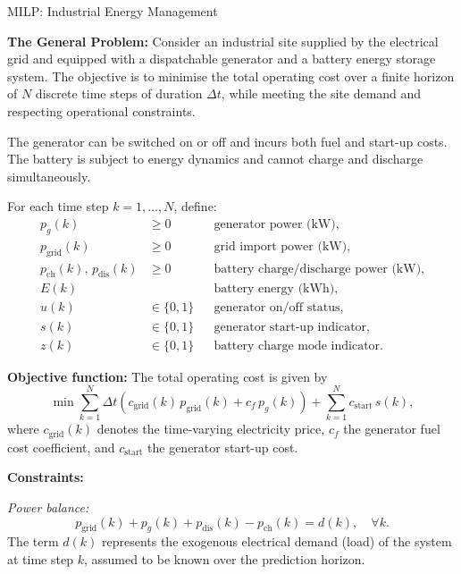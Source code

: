 \begin{examplebox}{MILP: Industrial Energy Management}
	
	\textbf{The General Problem:}
	Consider an industrial site supplied by the electrical grid and equipped with a dispatchable generator and a battery energy storage system. The objective is to minimise the total operating cost over a finite horizon of $N$ discrete time steps of duration $\Delta t$, while meeting the site demand and respecting operational constraints.
	
	The generator can be switched on or off and incurs both fuel and start-up costs. The battery is subject to energy dynamics and cannot charge and discharge simultaneously.
	
	\medskip
	
	For each time step $k=1,\dots,N$, define:
	\begin{align*}
		p_g(k) &\ge 0 && \text{generator power (kW)},\\
		p_{\mathrm{grid}}(k) &\ge 0 && \text{grid import power (kW)},\\
		p_{\mathrm{ch}}(k),\, p_{\mathrm{dis}}(k) &\ge 0 && \text{battery charge/discharge power (kW)},\\
		E(k) & && \text{battery energy (kWh)},\\
		u(k) &\in \{0,1\} && \text{generator on/off status},\\
		s(k) &\in \{0,1\} && \text{generator start-up indicator},\\
		z(k) &\in \{0,1\} && \text{battery charge mode indicator}.
	\end{align*}
	
	\medskip
	\textbf{Objective function:}
	The total operating cost is given by
	\begin{equation}
		\min \sum_{k=1}^{N} \Delta t 
		\left(
		c_{\mathrm{grid}}(k)\,p_{\mathrm{grid}}(k)
		+
		c_f\,p_g(k)
		\right)
		+
		\sum_{k=1}^{N} c_{\mathrm{start}}\, s(k),
	\end{equation}
	where $c_{\mathrm{grid}}(k)$ denotes the time-varying electricity price, $c_f$ the generator fuel cost coefficient, and $c_{\mathrm{start}}$ the generator start-up cost.
	
	\medskip
	\textbf{Constraints:}
	
	\emph{Power balance:}
	\begin{equation}
		p_{\mathrm{grid}}(k) + p_g(k) + p_{\mathrm{dis}}(k) - p_{\mathrm{ch}}(k) = d(k),
		\quad \forall k.
	\end{equation}
	The term $d(k)$ represents the exogenous electrical demand (load) of the system at time step $k$, assumed to be known over the prediction horizon.
	

\end{examplebox}
